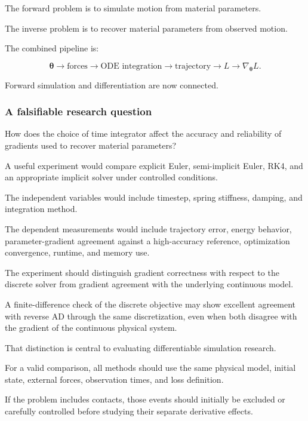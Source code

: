 The forward problem is to simulate motion from material parameters.

The inverse problem is to recover material parameters from observed motion.

The combined pipeline is:

\[
\boldsymbol\theta \rightarrow \text{forces} \rightarrow \text{ODE integration} \rightarrow \text{trajectory} \rightarrow L \rightarrow \nabla_{\boldsymbol\theta}L.
\]

Forward simulation and differentiation are now connected.

\subsubsection{A falsifiable research question}\label{02-foundations-ii-ch022-a-falsifiable-research-question}

\hypertarget{02-foundations-ii-ch022-a-falsifiable-research-question}{}

How does the choice of time integrator affect the accuracy and reliability of gradients used to recover material parameters?

A useful experiment would compare explicit Euler, semi-implicit Euler, RK4, and an appropriate implicit solver under controlled conditions.

The independent variables would include timestep, spring stiffness, damping, and integration method.

The dependent measurements would include trajectory error, energy behavior, parameter-gradient agreement against a high-accuracy reference, optimization convergence, runtime, and memory use.

The experiment should distinguish gradient correctness with respect to the discrete solver from gradient agreement with the underlying continuous model.

A finite-difference check of the discrete objective may show excellent agreement with reverse AD through the same discretization, even when both disagree with the gradient of the continuous physical system.

That distinction is central to evaluating differentiable simulation research.

For a valid comparison, all methods should use the same physical model, initial state, external forces, observation times, and loss definition.

If the problem includes contacts, those events should initially be excluded or carefully controlled before studying their separate derivative effects.

